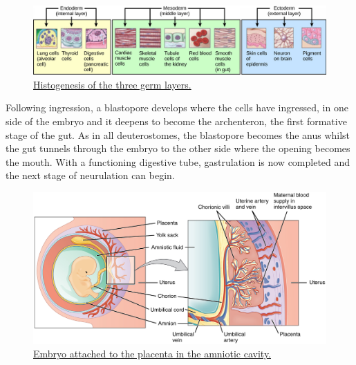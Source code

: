 \begin{figure}

{\centering \includegraphics[width=0.7\linewidth]{./figures/development/Germ_layers} 

}

\caption{\href{https://commons.wikimedia.org/wiki/File:Germ_layers.jpg}{Histogenesis of the three germ layers.}}\label{fig:germlayers}
\end{figure}

Following ingression, a blastopore develops where the cells have ingressed, in one side of the embryo and it deepens to become the archenteron, the first formative stage of the gut. As in all deuterostomes, the blastopore becomes the anus whilst the gut tunnels through the embryo to the other side where the opening becomes the mouth. With a functioning digestive tube, gastrulation is now completed and the next stage of neurulation can begin.



\begin{figure}

{\centering \includegraphics[width=0.7\linewidth]{./figures/development/2910_The_Placenta-02} 

}

\caption{\href{https://commons.wikimedia.org/wiki/File:2910_The_Placenta-02.jpg}{Embryo attached to the placenta in the amniotic cavity.}}\label{fig:embryoandplacenta}
\end{figure}

